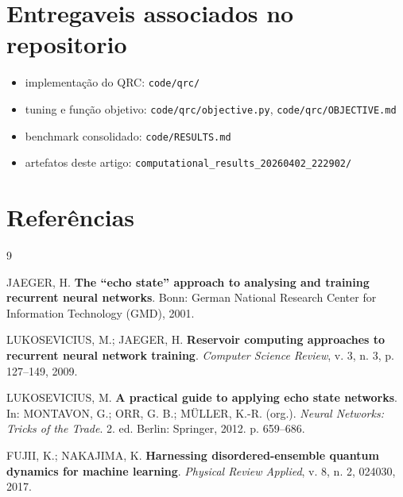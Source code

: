 \documentclass[12pt]{article}
\providecommand{\tightlist}{%
          \setlength{\itemsep}{0pt}\setlength{\parskip}{0pt}}
\begin{document}
\section{Entregaveis associados no repositorio}\label{entregaveis-associados-no-repositorio}

\begin{itemize}
\tightlist
\item
  implementação do QRC: \texttt{code/qrc/}
\item
  tuning e função objetivo: \texttt{code/qrc/objective.py}, \texttt{code/qrc/OBJECTIVE.md}
\item
  benchmark consolidado: \texttt{code/RESULTS.md}
\item
  artefatos deste artigo: \texttt{computational\_results\_20260402\_222902/}
\end{itemize}

\section{Referências}\label{referencias}

\begin{thebibliography}{9}

JAEGER, H. \textbf{The ``echo state'' approach to analysing and training recurrent neural networks}. Bonn: German National Research Center for Information Technology (GMD), 2001.

LUKOSEVICIUS, M.; JAEGER, H. \textbf{Reservoir computing approaches to recurrent neural network training}. \emph{Computer Science Review}, v. 3, n. 3, p. 127--149, 2009.

LUKOSEVICIUS, M. \textbf{A practical guide to applying echo state networks}. In: MONTAVON, G.; ORR, G. B.; MÜLLER, K.-R. (org.). \emph{Neural Networks: Tricks of the Trade}. 2. ed. Berlin: Springer, 2012. p. 659--686.

FUJII, K.; NAKAJIMA, K. \textbf{Harnessing disordered-ensemble quantum dynamics for machine learning}. \emph{Physical Review Applied}, v. 8, n. 2, 024030, 2017.

\end{thebibliography}

        
\end{document}
